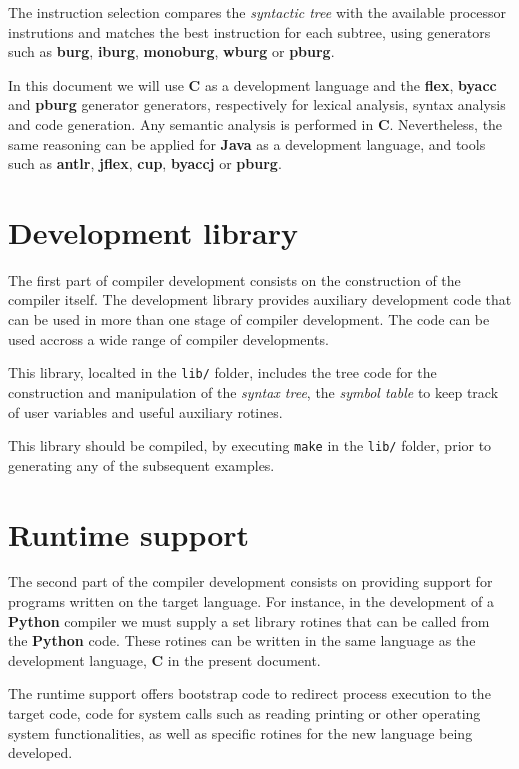 \documentclass[a4paper]{article}
\begin{document}
The instruction selection compares the {\em syntactic tree} with the available processor instrutions and matches the best instruction for each subtree, using generators such as {\bf burg}, {\bf iburg}, {\bf monoburg}, {\bf wburg} or {\bf pburg}.

In this document we will use {\bf C} as a development language and the {\bf flex}, {\bf byacc} and {\bf pburg} generator generators, respectively for lexical analysis, syntax analysis and code generation. Any semantic analysis is performed in {\bf C}. Nevertheless, the same reasoning can be applied for {\bf Java} as a development language, and tools such as {\bf antlr}, {\bf jflex}, {\bf cup}, {\bf byaccj} or {\bf pburg}.

\section{Development library} %

The first part of compiler development consists on the construction of the compiler itself.
The development library provides auxiliary development code that can be used in more than one stage of compiler development. The code can be used accross a wide range of compiler developments.

This library, localted in the {\tt lib/} folder, includes the tree code for the construction and manipulation of the {\em syntax tree}, the {\em symbol table} to keep track of user variables and useful auxiliary rotines.

This library should be compiled, by executing {\tt make} in the {\tt lib/} folder, prior to generating any of the subsequent examples.

\section{Runtime support} %

The second part of the compiler development consists on providing support for programs written on the target language. For instance, in the development of a {\bf Python} compiler we must supply a set library rotines that can be called from the {\bf Python} code. These rotines can be written in the same language as the development language, {\bf C} in the present document.

The runtime support offers bootstrap code to redirect process execution to the target code, code for system calls such as reading printing or other operating system functionalities, as well as specific rotines for the new language being developed.
\end{document}
